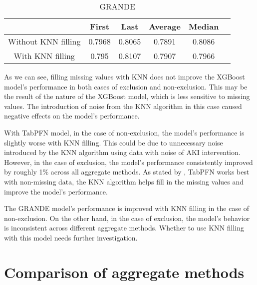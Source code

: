 \documentclass[../main.tex]{subfiles}
\begin{document}
\begin{table}[H]
    \begin{subtable}{\textwidth}
        \centering
        \caption{GRANDE}

        \begin{tabular}{|c|c|c|c|c|c|}
            \hline
            \textbf{} & 
            \textbf{First} & 
            \textbf{Last} & 
            \textbf{Average} &
            \textbf{Median} \\
            \hline

            Without KNN filling & 
            0.7968 & 
            0.8065 & 
            0.7891 &
            0.8086 \\

            With KNN filling & 
            0.795 & 
            0.8107 & 
            0.7907 &
            0.7966 \\

            \hline
        \end{tabular}
    \end{subtable}

\end{table}

As we can see, filling missing values with \gls{KNN} does not improve the XGBoost model's performance in both cases of exclusion and non-exclusion.
This may be the result of the nature of the XGBoost model, which is less sensitive to missing values.
The introduction of noise from the \gls{KNN} algorithm in this case caused negative effects on the model's performance.

With TabPFN model, in the case of non-exclusion, the model's performance is slightly worse with \gls{KNN} filling.
This could be due to unnecessary noise introduced by the \gls{KNN} algorithm using data with noise of \gls{AKI} intervention.
However, in the case of exclusion, the model's performance consistently improved by roughly 1\% across all aggregate methods.
As stated by \citeauthor{tabpfn}, TabPFN works best with non-missing data, the \gls{KNN} algorithm helps fill in the missing values and improve the model's performance.

The \gls{GRANDE} model's performance is improved with \gls{KNN} filling in the case of non-exclusion.
On the other hand, in the case of exclusion, the model's behavior is inconsistent across different aggregate methods.
Whether to use \gls{KNN} filling with this model needs further investigation.


\section{Comparison of aggregate methods}
\label{sec:aggregate_methods}
\end{document}
